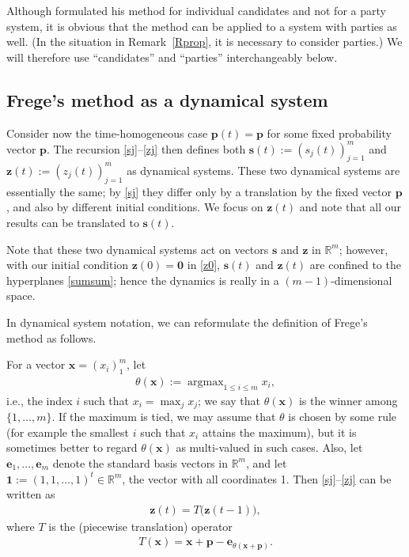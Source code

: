 \documentclass[11pt,reqno,tbtags,a4paper]{amsart}
\numberwithin{equation}{section}
\renewcommand\le{\leq}
\renewcommand\leq{\leqslant}
\theoremstyle{plain}%
\theoremstyle{definition}
\theoremstyle{remark}
\newcounter{cases}
\newcommand{\refR}[1]{Remark~\ref{#1}}
\newcommand\bigpar[1]{\bigl(#1\bigr)}
\newcommand\bbR{\mathbb R}
\newcommand\argmax{\operatorname{argmax}}
\newcommand\ve{\mathbf{e}}
\newcommand\vp{\mathbf{p}}
\newcommand\vs{\mathbf{s}}
\newcommand\vx{\mathbf{x}}
\newcommand\vz{\mathbf{z}}
\newcommand\0{{\boldsymbol 0}}
\newcommand\1{{\boldsymbol 1}}
\begin{document}
Although \citet{Frege} formulated his method for individual candidates and
not for a party system, it is obvious that the method can be applied to 
a system with parties as well.
(In the situation in \refR{Rprop}, it is necessary to consider parties.)
We will therefore use ``candidates'' and ``parties'' interchangeably below.

\subsection{Frege's method as a dynamical system}\label{SSdynamical}
Consider now the time-homogeneous case $\vp(t)=\vp$ for some fixed
probability vector $\vp$.
The recursion \eqref{sj}--\eqref{zj} then defines both
$\vs(t):=(s_j(t))_{j=1}^m$  and $\vz(t):=(z_j(t))_{j=1}^m$ as dynamical
systems.
These two dynamical systems are essentially the same; by \eqref{sj} they
differ only by a translation by the fixed vector $\vp$, and also by
different initial conditions. 
We focus on $\vz(t)$ and note that  all our results can be 
translated to $\vs(t)$.

Note that these two dynamical systems act on vectors $\vs$ and $\vz$ in
$\bbR^m$; however, with our initial condition $\vz(0)=\0$ in \eqref{z0},
$\vs(t)$ and $\vz(t)$ are confined to the hyperplanes \eqref{sumsum};
hence the dynamics is really in a $(m-1)$-dimensional space.

In dynamical system notation, we can reformulate the definition of Frege's
method as follows.

For a vector $\vx=(x_i)_1^m$, let
\begin{align}\label{theta}
  \theta(\vx) := \argmax_{1\le i\le m} x_i,
\end{align}
i.e., the index $i$ such that $x_i = \max_j x_j$;
we say that $\theta(\vx)$ is the winner among $\{1, \dots, m\}$.
If the maximum is tied, we may assume that $\theta$ is chosen by some rule
(for example the smallest $i$ such that $x_i$ attains the maximum),
but it is sometimes better to regard $\theta(\vx)$ as multi-valued in
such cases. 
Also, let $\ve_1,\dots,\ve_m$ denote the standard basis vectors in $\bbR^m$,
and let
$\1:=(1, 1, \dots, 1)^t\in\bbR^m$, the vector with all coordinates 1. 
Then \eqref{sj}--\eqref{zj} can be written as
\begin{align}\label{dyn}
  \vz(t) = T \bigpar{\vz(t-1)},
\end{align}
where $T$ is the (piecewise translation)  operator
\begin{align}\label{tx}
  T(\vx) = \vx+\vp-\ve_{\theta(\vx+\vp)}.
\end{align}
\end{document}
